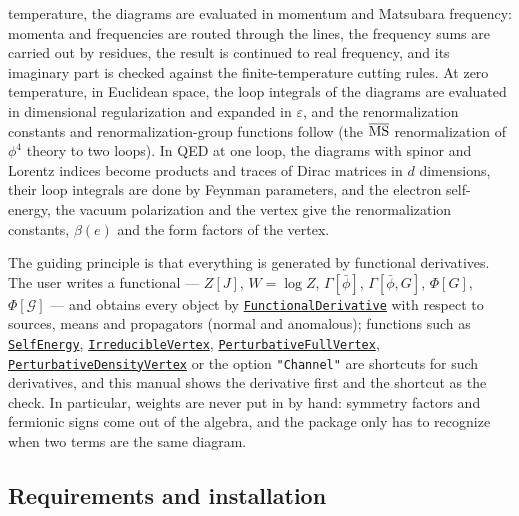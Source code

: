 \documentclass[11pt,a4paper]{article}
\newcommand{\pkg}[1]{\texttt{#1}}
\newcommand{\fnref}[1]{\hyperref[fn:#1]{\pkg{#1}}}
\newcommand{\opt}[1]{\texttt{"#1"}}
\begin{document}
\begin{itemize}
  temperature, the diagrams are evaluated in momentum and Matsubara frequency: momenta and frequencies are routed through
  the lines, the frequency sums are carried out by residues, the result is continued to real frequency, and its imaginary
  part is checked against the finite-temperature cutting rules. At zero temperature, in Euclidean space, the loop
  integrals of the diagrams are evaluated in dimensional regularization and expanded in $\varepsilon$, and the
  renormalization constants and renormalization-group functions follow (the $\overline{\rm MS}$ renormalization of
  $\phi^4$ theory to two loops). In QED at one loop, the diagrams with spinor and Lorentz indices become products and
  traces of Dirac matrices in $d$ dimensions, their loop integrals are done by Feynman parameters, and the electron
  self-energy, the vacuum polarization and the vertex give the renormalization constants, $\beta(e)$ and the form
  factors of the vertex.
\end{itemize}

The guiding principle is that everything is generated by functional derivatives. The user writes a functional --- $Z[J]$,
$W=\log Z$, $\Gamma[\bar\phi]$, $\Gamma[\bar\phi,G]$, $\Phi[G]$, $\Phi[\mathcal G]$ --- and obtains every object by
\fnref{FunctionalDerivative} with respect to sources, means and propagators (normal and anomalous); functions such as
\fnref{SelfEnergy}, \fnref{IrreducibleVertex}, \fnref{PerturbativeFullVertex}, \fnref{PerturbativeDensityVertex} or the option
\opt{Channel} are shortcuts for such derivatives, and this manual shows the derivative first and the shortcut as the
check. In particular, weights are never put in by hand: symmetry factors and fermionic signs come out of the algebra, and
the package only has to recognize when two terms are the same diagram.

\subsection{Requirements and installation}\label{sec:install}
\end{document}
